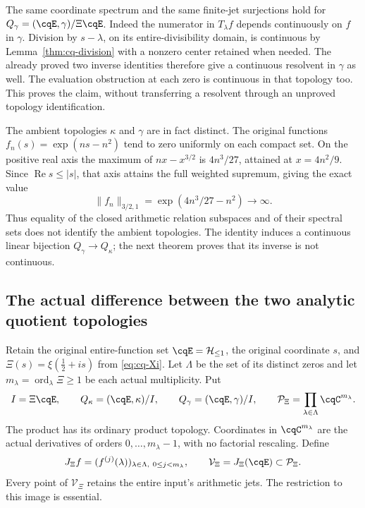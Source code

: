 The same coordinate spectrum and the same finite-jet surjections hold
for $Q_\gamma=(\cqE,\gamma)/\Xi\cqE$. Indeed the numerator in
$T_\lambda f$ depends continuously on $f$ in $\gamma$. Division
by $s-\lambda$, on its entire-divisibility domain, is continuous by
Lemma~\ref{thm:cq-division} with a nonzero center retained when
needed. The already proved two inverse identities therefore give a
continuous resolvent in $\gamma$ as well. The evaluation obstruction
at each zero is continuous in that topology too. This proves the
claim, without transferring a resolvent through an unproved topology
identification.

The ambient topologies $\kappa$ and $\gamma$ are in fact distinct.
The original functions $f_n(s)=\exp(ns-n^2)$ tend to zero uniformly
on each compact set. On the positive real axis the maximum of
$nx-x^{3/2}$ is $4n^3/27$, attained at $x=4n^2/9$. Since
$\operatorname{Re}s\leq|s|$, that axis attains the full weighted
supremum, giving the exact value
\[
 \|f_n\|_{3/2,1}=\exp(4n^3/27-n^2)\longrightarrow\infty.
\]
Thus equality of the closed arithmetic relation subspaces and of
their spectral sets does not identify the ambient topologies. The
identity induces a continuous linear bijection $Q_\gamma\to Q_\kappa$;
the next theorem proves that its inverse is not continuous.


\subsection{The actual difference between the two analytic quotient topologies}
\label{sec:cq-quotient-topologies}
Retain the original entire-function set $\cqE=\mathcal H_{\leq1}$,
the original coordinate $s$, and
$\Xi(s)=\xi(\tfrac12+is)$ from \eqref{eq:cq-Xi}.
Let $\Lambda$ be the set of its distinct zeros and let
$m_\lambda=\operatorname{ord}_\lambda\Xi\geq1$ be each actual
multiplicity. Put
\[
 I=\Xi\cqE,\qquad
 Q_\kappa=(\cqE,\kappa)/I,\qquad
 Q_\gamma=(\cqE,\gamma)/I,\qquad
 \mathcal P_\Xi=\prod_{\lambda\in\Lambda}\cqC^{m_\lambda}.
\]
The product has its ordinary product topology. Coordinates in
$\cqC^{m_\lambda}$ are the actual derivatives of orders
$0,\ldots,m_\lambda-1$, with no factorial rescaling. Define
\begin{equation}\label{eq:cq-total-jet-map}
 J_\Xi f=(f^{(j)}(\lambda))_{
          \lambda\in\Lambda,\ 0\leq j<m_\lambda},
 \qquad \mathcal V_\Xi=J_\Xi(\cqE)\subset\mathcal P_\Xi.
\end{equation}
Every point of $\mathcal V_\Xi$ retains the entire input's arithmetic
jets. The restriction to this image is essential.


